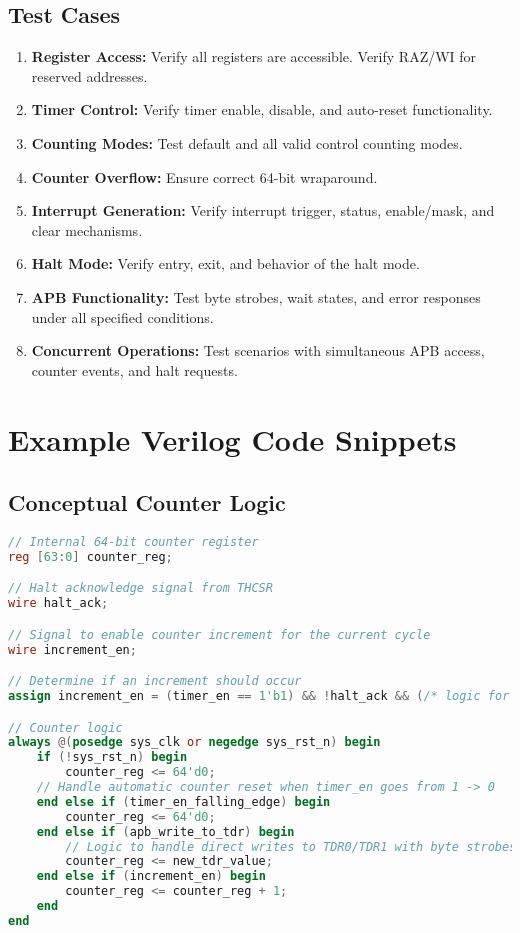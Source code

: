 \documentclass[11pt, a4paper]{article}
\begin{document}
\subsection{Test Cases}
\begin{enumerate}
    \item \textbf{Register Access:} Verify all registers are accessible. Verify RAZ/WI for reserved addresses.
    \item \textbf{Timer Control:} Verify timer enable, disable, and auto-reset functionality.
    \item \textbf{Counting Modes:} Test default and all valid control counting modes.
    \item \textbf{Counter Overflow:} Ensure correct 64-bit wraparound.
    \item \textbf{Interrupt Generation:} Verify interrupt trigger, status, enable/mask, and clear mechanisms.
    \item \textbf{Halt Mode:} Verify entry, exit, and behavior of the halt mode.
    \item \textbf{APB Functionality:} Test byte strobes, wait states, and error responses under all specified conditions.
    \item \textbf{Concurrent Operations:} Test scenarios with simultaneous APB access, counter events, and halt requests.
\end{enumerate}

\appendix
\section{Example Verilog Code Snippets}

\subsection{Conceptual Counter Logic}
\begin{lstlisting}[language=Verilog, caption=Conceptual 64-bit Counter Increment Logic]
// Internal 64-bit counter register
reg [63:0] counter_reg;

// Halt acknowledge signal from THCSR
wire halt_ack; 

// Signal to enable counter increment for the current cycle
wire increment_en; 

// Determine if an increment should occur
assign increment_en = (timer_en == 1'b1) && !halt_ack && (/* logic for div_val */);

// Counter logic
always @(posedge sys_clk or negedge sys_rst_n) begin
    if (!sys_rst_n) begin
        counter_reg <= 64'd0;
    // Handle automatic counter reset when timer_en goes from 1 -> 0
    end else if (timer_en_falling_edge) begin
        counter_reg <= 64'd0;
    end else if (apb_write_to_tdr) begin
        // Logic to handle direct writes to TDR0/TDR1 with byte strobes
        counter_reg <= new_tdr_value;
    end else if (increment_en) begin
        counter_reg <= counter_reg + 1;
    end
end
\end{lstlisting}
\end{document}
